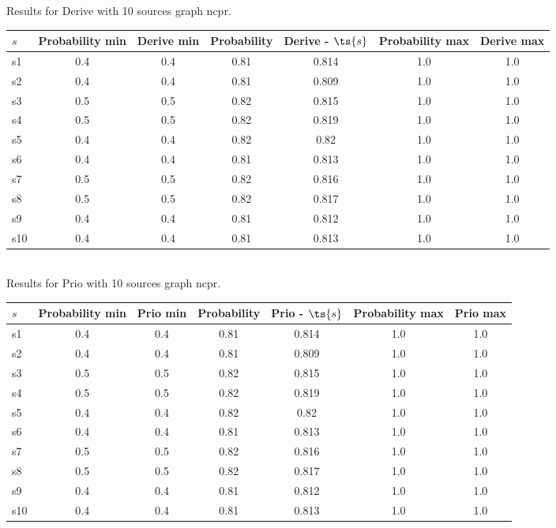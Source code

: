 \documentclass{article}
\begin{document}
\noindent Results for Derive with 10 sources graph ncpr.

\noindent\begin{tabular}{|l|c|c|c|c|c|c|}
\hline
$s$& Probability min & Derive min & Probability & Derive - $\ts{s}$ & Probability max & Derive max\\
\hline
s1 &0.4 & 0.4 & 0.81 & 0.814 & 1.0 & 1.0\\
\hline
s2 &0.4 & 0.4 & 0.81 & 0.809 & 1.0 & 1.0\\
\hline
s3 &0.5 & 0.5 & 0.82 & 0.815 & 1.0 & 1.0\\
\hline
s4 &0.5 & 0.5 & 0.82 & 0.819 & 1.0 & 1.0\\
\hline
s5 &0.4 & 0.4 & 0.82 & 0.82 & 1.0 & 1.0\\
\hline
s6 &0.4 & 0.4 & 0.81 & 0.813 & 1.0 & 1.0\\
\hline
s7 &0.5 & 0.5 & 0.82 & 0.816 & 1.0 & 1.0\\
\hline
s8 &0.5 & 0.5 & 0.82 & 0.817 & 1.0 & 1.0\\
\hline
s9 &0.4 & 0.4 & 0.81 & 0.812 & 1.0 & 1.0\\
\hline
s10 &0.4 & 0.4 & 0.81 & 0.813 & 1.0 & 1.0\\
\hline
\end{tabular}\\

\noindent Results for Prio with 10 sources graph ncpr.

\noindent\begin{tabular}{|l|c|c|c|c|c|c|}
\hline
$s$& Probability min & Prio min & Probability & Prio - $\ts{s}$ & Probability max & Prio max\\
\hline
s1 &0.4 & 0.4 & 0.81 & 0.814 & 1.0 & 1.0\\
\hline
s2 &0.4 & 0.4 & 0.81 & 0.809 & 1.0 & 1.0\\
\hline
s3 &0.5 & 0.5 & 0.82 & 0.815 & 1.0 & 1.0\\
\hline
s4 &0.5 & 0.5 & 0.82 & 0.819 & 1.0 & 1.0\\
\hline
s5 &0.4 & 0.4 & 0.82 & 0.82 & 1.0 & 1.0\\
\hline
s6 &0.4 & 0.4 & 0.81 & 0.813 & 1.0 & 1.0\\
\hline
s7 &0.5 & 0.5 & 0.82 & 0.816 & 1.0 & 1.0\\
\hline
s8 &0.5 & 0.5 & 0.82 & 0.817 & 1.0 & 1.0\\
\hline
s9 &0.4 & 0.4 & 0.81 & 0.812 & 1.0 & 1.0\\
\hline
s10 &0.4 & 0.4 & 0.81 & 0.813 & 1.0 & 1.0\\
\hline
\end{tabular}\\
\end{document}
